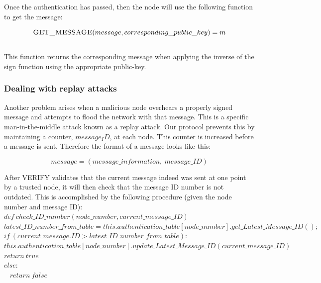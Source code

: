 \documentclass[letterpaper]{article}
\begin{document}
\noindent Once the authentication has passed, then the node will use the following function to get the message:

$$\textsc{GET\_MESSAGE}(message, corresponding\_public\_key) = m$$
\\

\noindent This function returns the corresponding message when applying the inverse of the sign function using the appropriate public-key.

\subsubsection{Dealing with replay attacks}

Another problem arises when a malicious node overhears a properly signed message and attempts to flood the network  with that message. This is a specific man-in-the-middle attack known as a replay attack. Our protocol prevents this by maintaining a counter, $message_ID$, at each node. This counter is increased before a message is sent. Therefore the format of a message looks like this:

$$message = (message\_information, \ message\_ID)$$

\noindent After \textsc{VERIFY} validates that the current message indeed was sent at one point by a trusted node, 
it will then check that the message ID number is not outdated. This is accomplished by the following procedure 
(given the node number and message ID):
\\

$def \ check\_ID\_number(node\_number, current\_message\_ID)$ \\
\hspace*{10 mm} $latest\_ID\_number\_from\_table = this.authentication\_table[node\_number].get\_Latest\_Message\_ID();$
\hspace*{10 mm} $if \ (current\_message.ID > latest\_ID\_number\_from\_table):$\\
\hspace*{20 mm} $this.authentication\_table[node\_number].update\_Latest\_Message\_ID(current\_message\_ID)$\\
\hspace*{20 mm} $return \ true$ \\
\hspace*{10 mm} $else:$\\ \ 
\hspace*{20 mm} $return \ false$\\
\end{document}

